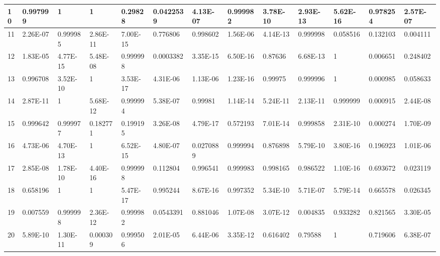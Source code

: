 \documentclass[a4paper,10pt]{article}
\begin{document}
\begin{centering}
{\begin{tabular}{ |l|l|l|l|l|l|l|l|l|l|l|l|l| }
	10	       & 0.997999 & 1        & 1        & 0.29828  & 0.0422539 &  4.13E-07      &  0.999982 & 3.78E-10 & 2.93E-13 & 5.62E-16 & 0.978254 & 2.57E-07 \\ \hline                            
	11	       & 2.26E-07 & 0.999985 & 2.86E-11 & 7.00E-15 & 0.776806  &  0.998602      &  1.56E-06 & 4.14E-13 & 0.999998 & 0.058516 & 0.132103 & 0.004111 \\ \hline                                                  
	12	       & 1.83E-05 & 4.77E-15 & 5.48E-08 & 0.999998 & 0.0003382 &  3.35E-15      &  6.50E-16 & 0.87636  & 6.68E-13 & 1        & 0.006651 & 0.248402 \\ \hline                                      
	13	       & 0.996708 & 3.52E-10 & 1        & 3.53E-17 & 4.31E-06  & 1.13E-06       &  1.23E-16 & 0.99975  & 0.999996 & 1        & 0.000985 & 0.058633 \\ \hline                         
	14	       & 2.87E-11 & 1        & 5.68E-12 & 0.999994 & 5.38E-07  & 0.99981        &  1.14E-14 & 5.24E-11 & 2.13E-11 & 0.999999 & 0.000915 & 2.44E-08 \\ \hline                                         
	15	       & 0.999642 & 0.999977 & 0.182771 & 0.199195 & 3.26E-08  & 4.79E-17       &  0.572193 & 7.01E-14 & 0.999858 & 2.31E-10 & 0.000274 & 1.70E-09 \\ \hline                                             
	16	       & 4.73E-06 & 4.70E-13 & 1        & 6.52E-15 & 4.80E-07  & 0.0270889      &  0.999994 & 0.876898 & 5.79E-10 & 3.80E-16 & 0.196923 & 1.01E-06 \\ \hline                                       
	17	       & 2.85E-08 & 1.78E-10 & 4.40E-16 & 0.999998 & 0.112804  &  0.996541      &  0.999983 & 0.998165 & 0.986522 & 1.10E-16 & 0.693672 & 0.023119 \\ \hline                                              
	18	       & 0.658196 & 1        & 1        & 5.47E-17 & 0.995244  &  8.67E-16      &  0.997352 & 5.34E-10 & 5.71E-07 & 5.79E-14 & 0.665578 & 0.026345 \\ \hline                             
	19	       & 0.007559 & 0.999998 & 2.36E-12 & 0.999982 & 0.0543391 &  0.881046      &  1.07E-08 & 3.07E-12 & 0.004835 & 0.933282 & 0.821565 & 3.30E-05 \\ \hline                                                 
	20	       & 5.89E-10 & 1.30E-11 & 0.000309 & 0.999506 & 2.01E-05  & 6.44E-06       &  3.35E-12 & 0.616402 & 0.79588  & 1        & 0.719606 & 6.38E-07 \\ \hline                               

\end{tabular}}
\end{centering}
\end{document}
